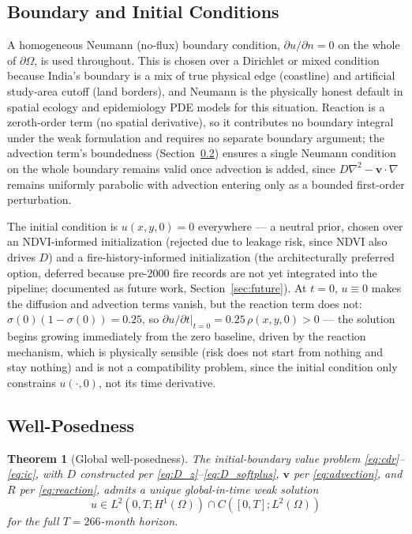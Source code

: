 \documentclass[journal]{IEEEtran}
\newtheorem{theorem}{Theorem}
\begin{document}
\subsection{Boundary and Initial Conditions}

A homogeneous Neumann (no-flux) boundary condition, $\partial u/\partial n=0$ on the whole of $\partial\Omega$, is used throughout. This is chosen over a Dirichlet or mixed condition because India's boundary is a mix of true physical edge (coastline) and artificial study-area cutoff (land borders), and Neumann is the physically honest default in spatial ecology and epidemiology PDE models for this situation. Reaction is a zeroth-order term (no spatial derivative), so it contributes no boundary integral under the weak formulation and requires no separate boundary argument; the advection term's boundedness (Section~\ref{sec:wellposedness}) ensures a single Neumann condition on the whole boundary remains valid once advection is added, since $D\nabla^2-\mathbf{v}\cdot\nabla$ remains uniformly parabolic with advection entering only as a bounded first-order perturbation.

The initial condition is $u(x,y,0)=0$ everywhere --- a neutral prior, chosen over an NDVI-informed initialization (rejected due to leakage risk, since NDVI also drives $D$) and a fire-history-informed initialization (the architecturally preferred option, deferred because pre-2000 fire records are not yet integrated into the pipeline; documented as future work, Section~\ref{sec:future}). At $t=0$, $u\equiv0$ makes the diffusion and advection terms vanish, but the reaction term does not: $\sigma(0)(1-\sigma(0))=0.25$, so $\partial u/\partial t|_{t=0}=0.25\,\rho(x,y,0)>0$ --- the solution begins growing immediately from the zero baseline, driven by the reaction mechanism, which is physically sensible (risk does not start from nothing and stay nothing) and is not a compatibility problem, since the initial condition only constrains $u(\cdot,0)$, not its time derivative.

\subsection{Well-Posedness}
\label{sec:wellposedness}

\begin{theorem}[Global well-posedness]
\label{thm:wellposed}
The initial-boundary value problem \eqref{eq:cdr}--\eqref{eq:ic}, with $D$ constructed per \eqref{eq:D_z}--\eqref{eq:D_softplus}, $\mathbf{v}$ per \eqref{eq:advection}, and $R$ per \eqref{eq:reaction}, admits a unique global-in-time weak solution
\[
u \in L^2(0,T;H^1(\Omega)) \cap C([0,T];L^2(\Omega))
\]
for the full $T=266$-month horizon.
\end{theorem}
\end{document}
